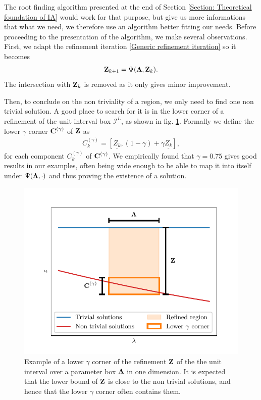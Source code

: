 \documentclass[
11pt, %
american, %
singlespacing, %
final, %
nolistspacing, %
liststotoc, %
headsepline, %
]{MastersDoctoralThesis} %
\begin{document}
The root finding algorithm presented at the end of Section \ref{Section: Theoretical foundation of IA} would work for that purpose, but give us more informations that what we need, we therefore use an algorithm better fitting our needs. Before proceeding to the presentation of the algorithm, we make several observations. First, we adapt the refinement iteration \eqref{Generic refinement iteration} so it becomes
\begin{align}
	\boldsymbol{\mathrm{Z}}_{k+1} = \Psi(\boldsymbol{\mathrm{\Lambda}}, \boldsymbol{\mathrm{Z}}_k). \label{Fixpoint refinement}
\end{align}
The intersection with $\boldsymbol{\mathrm{Z}}_k$ is removed as it only gives minor improvement.

Then, to conclude on the non triviality of a region, we only need to find one non trivial solution. A good place to search for it is in the lower corner of a refinement of the unit interval box $\mathcal{I}^L$, as shown in fig. \ref{Figure: Lower corner}. Formally we define the lower $\gamma$ corner $\boldsymbol{\mathrm{C}}^{(\gamma)}$ of $\boldsymbol{\mathrm{Z}}$ as
\begin{align}
	C^{(\gamma)}_k = \left[ \underline{Z_k}, (1 - \gamma) + \gamma \underline{Z_k} \right],
\end{align}
for each component $C^{(\gamma)}_k$ of $\boldsymbol{\mathrm{C}}^{(\gamma)}$. We empirically found that $\gamma = 0.75$ gives good results in our examples, often being wide enough to be able to map it into itself under $\Psi(\boldsymbol{\mathrm{\Lambda}}, \cdot)$ and thus proving the existence of a solution.

\begin{figure}
	\includegraphics[scale=0.8]{lower_corner.pdf}
	\caption{Example of a lower $\gamma$ corner of the refinement $\boldsymbol{\mathrm{Z}}$ of the the unit interval over a parameter box $\boldsymbol{\mathrm{\Lambda}}$ in one dimension. It is expected that the lower bound of $\boldsymbol{\mathrm{Z}}$ is close to the non trivial solutions, and hence that the lower $\gamma$ corner often contains them.}
	\label{Figure: Lower corner}
\end{figure}
\end{document}
